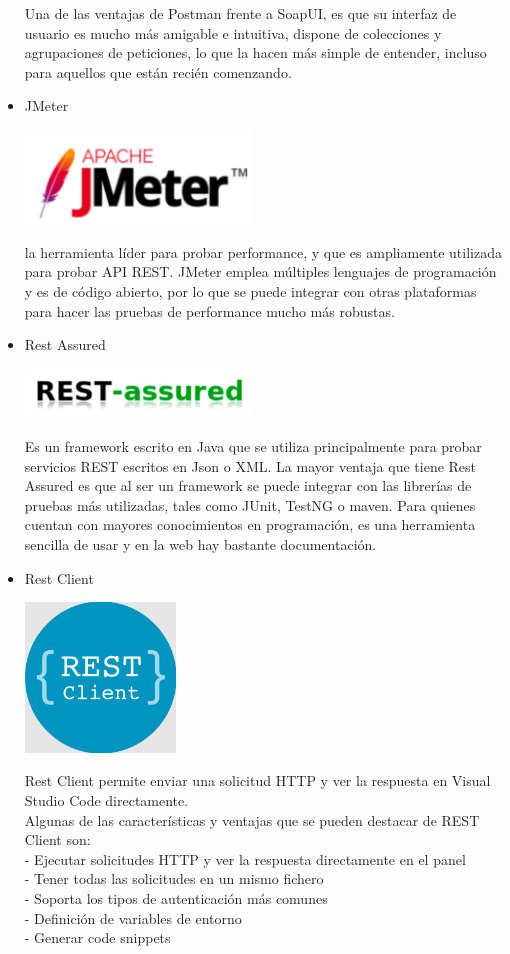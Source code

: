 \documentclass[twoside,twocolumn]{article}
\begin{document}
\begin{itemize}
Una de las ventajas de Postman frente a SoapUI, es que su interfaz de usuario es mucho más amigable e intuitiva, dispone de colecciones y agrupaciones de peticiones, lo que la hacen más simple de entender, incluso para aquellos que están recién comenzando.
\\
\item JMeter
\begin{center}
	\includegraphics[width=6cm]{./imagenes/jmeter.png} 
	\end{center}
la herramienta líder para probar performance, y que es ampliamente utilizada para probar API REST. JMeter emplea múltiples lenguajes de programación y es de código abierto, por lo que se puede integrar con otras plataformas para hacer las pruebas de performance mucho más robustas.
\\
\item Rest Assured
\begin{center}
	\includegraphics[width=6cm]{./imagenes/rest.png} 
	\end{center}
Es un framework escrito en Java que se utiliza principalmente para probar servicios REST escritos en Json o XML. La mayor ventaja que tiene Rest Assured es que al ser un framework se puede integrar con las librerías de pruebas más utilizadas, tales como JUnit, TestNG o maven. Para quienes cuentan con mayores conocimientos en programación, es una herramienta sencilla de usar y en la web hay bastante documentación.
\item Rest Client
\begin{center}
	\includegraphics[width=4cm]{./imagenes/restclient.png}
	\end{center}
Rest Client permite enviar una solicitud HTTP y ver la respuesta en Visual Studio Code directamente.\\
Algunas de las características y ventajas que se pueden destacar de REST Client son:\\
- Ejecutar solicitudes HTTP y ver la respuesta directamente en el panel\\
- Tener todas las solicitudes en un mismo fichero\\
- Soporta los tipos de autenticación más comunes\\
- Definición de variables de entorno\\
- Generar code snippets\\
\end{itemize}
\end{document}

